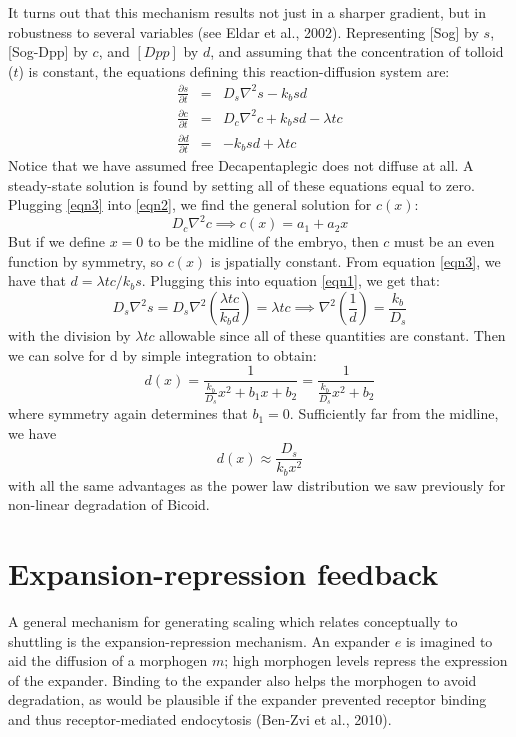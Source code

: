 \documentclass{article}
\begin{document}
It turns out that this mechanism results not just in a sharper gradient, but in robustness to several variables (see Eldar et al., 2002). Representing [Sog] by $s$, [Sog-Dpp] by $c$, and $[Dpp]$ by $d$, and assuming that the concentration of tolloid ($t$) is constant, the equations defining this reaction-diffusion system are:
\begin{eqnarray}
\frac{\partial s}{\partial t} & = & D_{s} \nabla^2 s - k_b s d \label{eqn1}\\
\frac{\partial c}{\partial t} & = & D_{c} \nabla^2 c + k_b s d - \lambda t c \label{eqn2}\\
\frac{\partial d}{\partial t} & = & - k_b s d + \lambda t c \label{eqn3}
\end{eqnarray}
Notice that we have assumed free Decapentaplegic does not diffuse at all. A steady-state solution is found by setting all of these equations equal to zero. Plugging \ref{eqn3} into \ref{eqn2}, we find the general solution for $c(x)$:
\[ D_{c} \nabla^2 c \implies c(x) = a_1 + a_2 x \]
But if we define $x=0$ to be the midline of the embryo, then $c$ must be an even function by symmetry, so $c(x)$ is jspatially constant. From equation \ref{eqn3}, we have that $d = \lambda t c / k_b s$. Plugging this into equation \ref{eqn1}, we get that:
\[ D_{s} \nabla^2 s = D_{s} \nabla^2 \left( \frac{\lambda t c}{k_b d} \right) =  \lambda t c \implies \nabla^2 \left( \frac{1}{d} \right) = \frac{k_b}{D_s} \]
with the division by $\lambda t c$ allowable since all of these quantities are constant. Then we can solve for d by simple integration to obtain:
\[ d(x) = \frac{1}{\frac{k_b}{D_s} x^2 + b_1 x + b_2} = \frac{1}{\frac{k_b}{D_s} x^2 + b_2} \]
where symmetry again determines that $b_1=0$. Sufficiently far from the midline, we have
\[ d(x) \approx \frac{D_s}{k_b x^2} \]
with all the same advantages as the power law distribution we saw previously for non-linear degradation of Bicoid.

\section*{Expansion-repression feedback}

A general mechanism for generating scaling which relates conceptually to shuttling is the expansion-repression mechanism. An expander $e$ is imagined to aid the diffusion of a morphogen $m$; high morphogen levels repress the expression of the expander. Binding to the expander also helps the morphogen to avoid degradation, as would be plausible if the expander prevented receptor binding and thus receptor-mediated endocytosis (Ben-Zvi et al., 2010).\\
\end{document}
